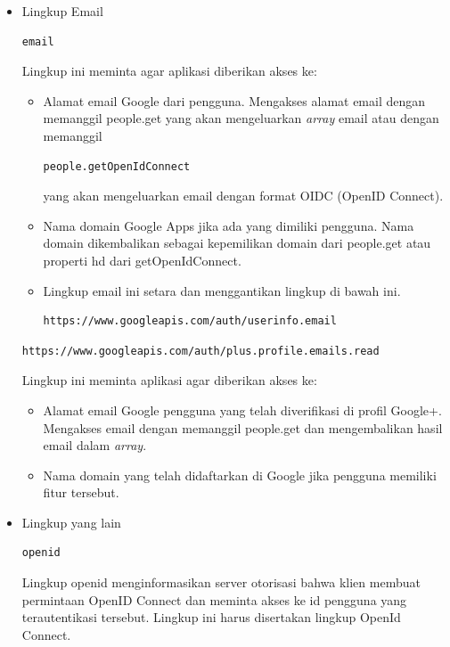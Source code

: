 \begin{itemize}
\item Lingkup Email\\
\begin{lstlisting}[basicstyle=\footnotesize]
email
\end{lstlisting}
Lingkup ini meminta agar aplikasi diberikan akses ke:
\begin{itemize}
\item
Alamat email Google dari pengguna. Mengakses alamat email dengan memanggil people.get yang akan mengeluarkan {\it array} email atau dengan memanggil
\begin{lstlisting}[basicstyle=\footnotesize]
people.getOpenIdConnect
\end{lstlisting}
yang akan mengeluarkan email dengan format OIDC (OpenID Connect).
\item
Nama domain Google Apps jika ada yang dimiliki pengguna. Nama domain
dikembalikan sebagai kepemilikan domain dari people.get atau properti hd dari getOpenIdConnect.
\item
Lingkup email ini setara dan menggantikan lingkup di bawah ini.
\begin{lstlisting}[basicstyle=\footnotesize]
https://www.googleapis.com/auth/userinfo.email
\end{lstlisting}
\end{itemize}
\begin{lstlisting}[basicstyle=\footnotesize]
https://www.googleapis.com/auth/plus.profile.emails.read
\end{lstlisting}
Lingkup ini meminta aplikasi agar diberikan akses ke:
\begin{itemize}
\item
Alamat email Google pengguna yang telah diverifikasi di profil Google+. Mengakses email dengan memanggil people.get dan mengembalikan hasil email dalam {\it array}.
\item
Nama domain yang telah didaftarkan di Google jika pengguna memiliki fitur tersebut.
\end{itemize}

\item Lingkup yang lain\\
\begin{lstlisting}[basicstyle=\footnotesize]
openid
\end{lstlisting}
Lingkup openid menginformasikan server otorisasi bahwa klien membuat permintaan OpenID Connect dan meminta akses ke id pengguna yang terautentikasi tersebut. Lingkup ini harus disertakan lingkup OpenId Connect.


\end{itemize}
